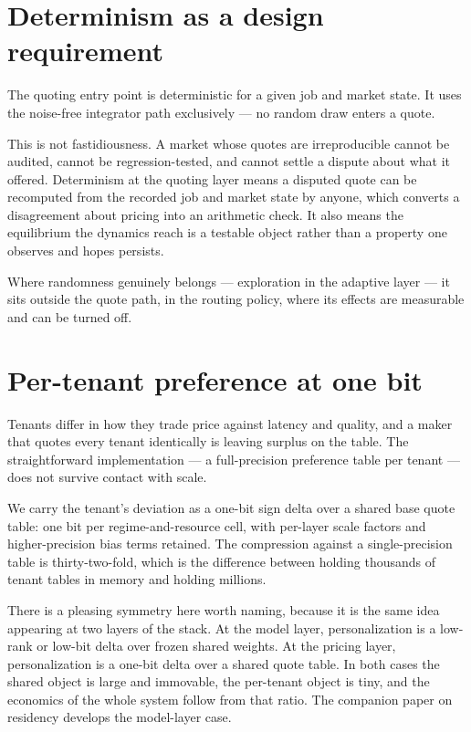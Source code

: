 \documentclass[11pt,a4paper]{article}
\begin{document}
\section{Determinism as a design requirement}

The quoting entry point is deterministic for a given job and market state. It
uses the noise-free integrator path exclusively --- no random draw enters a
quote.

This is not fastidiousness. A market whose quotes are irreproducible cannot be
audited, cannot be regression-tested, and cannot settle a dispute about what it
offered. Determinism at the quoting layer means a disputed quote can be
recomputed from the recorded job and market state by anyone, which converts a
disagreement about pricing into an arithmetic check. It also means the equilibrium
the dynamics reach is a testable object rather than a property one observes and
hopes persists.

Where randomness genuinely belongs --- exploration in the adaptive layer --- it
sits outside the quote path, in the routing policy, where its effects are
measurable and can be turned off.

\section{Per-tenant preference at one bit}

Tenants differ in how they trade price against latency and quality, and a maker
that quotes every tenant identically is leaving surplus on the table. The
straightforward implementation --- a full-precision preference table per tenant
--- does not survive contact with scale.

We carry the tenant's deviation as a one-bit sign delta over a shared base quote
table: one bit per regime-and-resource cell, with per-layer scale factors and
higher-precision bias terms retained. The compression against a
single-precision table is thirty-two-fold, which is the difference between
holding thousands of tenant tables in memory and holding millions.

There is a pleasing symmetry here worth naming, because it is the same idea
appearing at two layers of the stack. At the model layer, personalization is a
low-rank or low-bit delta over frozen shared weights. At the pricing layer,
personalization is a one-bit delta over a shared quote table. In both cases the
shared object is large and immovable, the per-tenant object is tiny, and the
economics of the whole system follow from that ratio. The companion paper on
residency develops the model-layer case.
\end{document}
